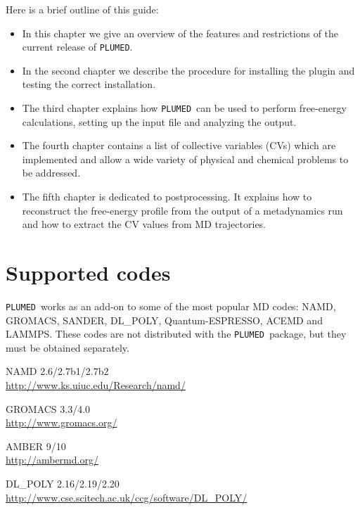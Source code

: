 \documentclass[12pt,fleqn]{report}
\newcommand{\plumed}{{\tt PLUMED}}
\begin{document}
Here is a brief outline of this guide:
\begin{itemize}
\item In this chapter we give  an overview
of the features and restrictions of  the current release of \plumed.
\item In the second chapter we describe the
procedure for installing the plugin and  testing the correct installation.
\item The third chapter explains how \plumed \ can be used to perform free-energy calculations, 
setting up the input file and analyzing the output.
\item The fourth chapter contains  a list of collective variables (CVs) which are implemented
and allow a wide variety of physical and chemical problems to be addressed.
\item The fifth chapter is dedicated to postprocessing. It explains how to reconstruct the
free-energy profile from the output of a metadynamics run and how to extract the CV values from MD trajectories.
\end{itemize}

\section{Supported codes}
\label{supported}
 \plumed \ works as an add-on to some of the most popular MD codes:
NAMD, GROMACS, SANDER, DL\_POLY, Quantum-ESPRESSO, ACEMD and LAMMPS.
These codes are not distributed with the \plumed \ package, but they must be obtained separately.
\vspace{0.3cm}

NAMD 2.6/2.7b1/2.7b2   \\    \url{http://www.ks.uiuc.edu/Research/namd/}

\vspace{0.3cm}

GROMACS 3.3/4.0      \\   \url{http://www.gromacs.org/}

\vspace{0.3cm}

AMBER 9/10          \\     \url{http://ambermd.org/}

\vspace{0.3cm}

DL\_POLY 2.16/2.19/2.20     \\  \url{http://www.cse.scitech.ac.uk/ccg/software/DL\_POLY/}
\end{document}
